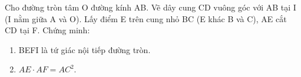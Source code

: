 \begin{ex}
Cho đường tròn tâm O đường kính AB. Vẽ dây cung CD vuông góc với AB tại I (I nằm giữa A và O). Lấy điểm E trên cung nhỏ BC (E khác B và C), AE cắt CD tại F. Chứng minh:
	\begin{enumerate}
		\item[a)] BEFI là tứ giác nội tiếp đường tròn.
		\item[b)] $AE \cdot AF = AC^2$.
	\end{enumerate}
\end{ex}
